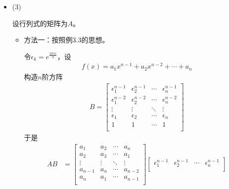 \documentclass{article}
\begin{document}
\begin{itemize}
  \item (3)

        设行列式的矩阵为$A$。

        \begin{itemize}
          \item 方法一：按照例3.3的思想。

                令$\epsilon_k = e^{\frac{2k \pi i}{n}}$，设
                \begin{align*}
                  f(x) = a_1 x^{n - 1} + a_2 x^{n - 2} + \cdots + a_n
                \end{align*}
                构造$n$阶方阵
                \begin{align*}
                  B = \begin{bmatrix}
                        \epsilon_1^{n-1} & \epsilon_2^{n-1} & \cdots & \epsilon_n^{n-1} \\
                        \epsilon_1^{n-2} & \epsilon_2^{n-2} & \cdots & \epsilon_n^{n-2} \\
                        \vdots           & \vdots           & \ddots & \vdots           \\
                        \epsilon_1       & \epsilon_2       & \cdots & \epsilon_n       \\
                        1                & 1                & \cdots & 1                \\
                      \end{bmatrix}
                \end{align*}
                于是
                \begin{align*}
                  A B & = \begin{bmatrix}
                            a_1     & a_2    & \cdots & a_n       \\
                            a_2     & a_3    & \cdots & a_1       \\
                            \vdots  & \vdots & \ddots & \vdots    \\
                            a_{n-1} & a_n    & \cdots & a_{n - 2} \\
                            a_n     & a_1    & \cdots & a_{n - 1} \\
                          \end{bmatrix}
                  \begin{bmatrix}
                    \epsilon_1^{n-1} & \epsilon_2^{n-1} & \cdots & \epsilon_n^{n-1} \\

\end{bmatrix}
\end{align*}
\end{itemize}
\end{itemize}
\end{document}
